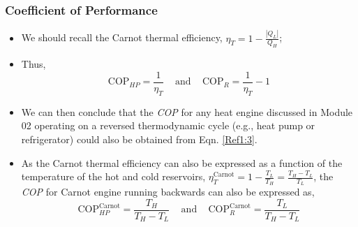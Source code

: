 \documentclass[10pt,compress]{beamer}
\newcommand{\frc}{\displaystyle\frac}
\begin{document}
\begin{frame}
 \frametitle{Coefficient of Performance}
 \begin{itemize}
  \item <1-> We should recall the Carnot thermal efficiency, $\eta_{T}=1-\frc{|Q_{L}|}{Q_{H}}$;
  \item <2-> Thus,
   \begin{equation}
    \text{COP}_{HP}=\frc{1}{\eta_{T}}\;\;\;\text{ and }\;\;\;\text{COP}_{R}=\frc{1}{\eta_{T}}-1
     \label{Ref1:3}
   \end{equation}
  \item <3-> We can then conclude that the {\it COP} for any heat engine discussed in Module 02 operating on a reversed thermodynamic cycle (e.g., heat pump or refrigerator) could also be obtained from Eqn. \ref{Ref1:3}. 
  \item <4-> As the Carnot thermal efficiency can also be expressed as a function of the temperature of the hot and cold reservoirs, $\eta_{T}^{\text{Carnot}}=1-\frc{T_{L}}{T_{H}}=\frc{T_{H}-T_{L}}{T_{L}}$, the {\it COP} for Carnot engine running backwards can also be expressed as,
\begin{equation}
\text{COP}_{HP}^{\text{Carnot}}=\frc{T_{H}}{T_{H}-T_{L}}\;\;\;\text{ and }\;\;\; \text{COP}_{R}^{\text{Carnot}}=\frc{T_{L}}{T_{H}-T_{L}}
\end{equation}
 \end{itemize}
\end{frame}
\end{document}
